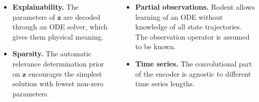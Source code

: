 \documentclass[25pt]{tikzposter}
\begin{document}
\begin{columns}
{    \vspace{1cm}
    \begin{minipage}[t]{.28\textwidth}
    \begin{itemize}
      \item \textbf{Explainability.}  The parameters of $\bm z$ are
        decoded through an ODE solver, which gives them physical meaning.
      \item \textbf{Sparsity.} The automatic relevance determination prior on
        $\bm{z}$ encourages the simplest solution with fewest non-zero parameters.
    \end{itemize}
    \end{minipage}
    \hspace{.01\textwidth}
    \begin{minipage}[t]{.28\textwidth}
    \begin{itemize}
      \item \textbf{Partial observations.} Rodent allows learning of an ODE
        without knowledge of all state trajectories. The
        observation operator is assumed to be known.
      \item \textbf{Time series.} The convolutional part of the encoder is
        agnostic to different time series lengths.
    \end{itemize}
    \end{minipage}


  }


\end{columns}
\end{document}
